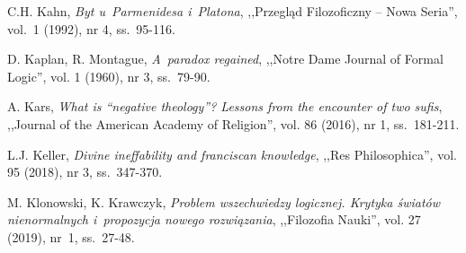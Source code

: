 \begin{thebibliography}{100}


C.H. Kahn, \textit{Byt u~Parmenidesa i~Platona}, ,,Przegląd Filozoficzny -- Nowa Seria'', vol.~1 (1992), nr 4, ss.~95-116.


D. Kaplan, R. Montague, \textit{A~paradox regained}, ,,Notre Dame Journal of Formal Logic'', vol. 1 (1960), nr 3, ss.~79-90.

A. Kars, \textit{What is ``negative theology''? Lessons from the encounter of two sufis}, ,,Journal of the American Academy of Religion'', vol. 86 (2016), nr 1, ss.~181-211.



L.J. Keller, \textit{Divine ineffability and franciscan knowledge}, ,,Res Philosophica'', vol. 95 (2018), nr 3, ss.~347-370.


M. Klonowski, K. Krawczyk, \textit{Problem wszechwiedzy logicznej. Krytyka światów nienormalnych i~propozycja nowego rozwiązania}, ,,Filozofia Nauki'', vol. 27 (2019), nr~1, ss.~27-48.


\end{thebibliography}
